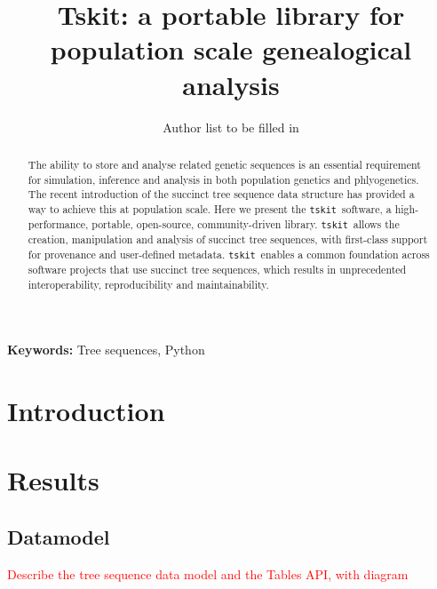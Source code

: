 \documentclass{article}
\newcommand{\tskit}[0]{\texttt{tskit}}
\newcommand{\jkcomment}[1]{\textcolor{red}{#1}}
\begin{document}
\title{Tskit: a portable library for population scale genealogical analysis}
\author{Author list to be filled in
}




\maketitle

\begin{abstract}
The ability to store and analyse related genetic sequences is an
essential requirement for simulation, inference and analysis in both
population genetics and phlyogenetics. The recent introduction of the
succinct tree sequence data structure has provided a way to achieve
this at population scale. Here we present the \tskit\ software,
a high-performance, portable, open-source, community-driven library.
\tskit\ allows the creation, manipulation and analysis of succinct tree
sequences, with first-class support for provenance and user-defined metadata.
\tskit\ enables a common foundation across software projects that use
succinct tree sequences, which results in unprecedented interoperability,
reproducibility and maintainability.
\end{abstract}


\textbf{Keywords:} Tree sequences, Python

\section*{Introduction}

\citep{kelleher2018efficient}

\section*{Results}

\subsection*{Datamodel}
\jkcomment{Describe the tree sequence data model and the Tables API, with diagram}
\end{document}

